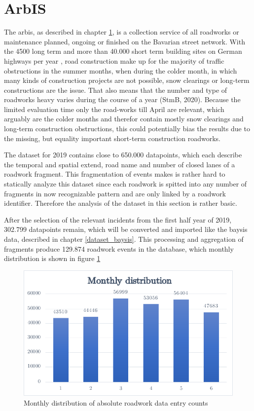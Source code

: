 \documentclass[a4paper,12pt]{report}
\begin{document}
\section{ArbIS}
\label{dataset_arbis}

The \acrfull{arbis}, as described in chapter \ref{dataset_arbis}, is a collection service of all roadworks or maintenance planned, ongoing or finished on the Bavarian street network. With the 4500 long term and more than 40.000 short term building sites on German highways per year \cite{LAPID2018,Stmi2020}, road construction make up for the majority of traffic obstructions in the summer months, when during the colder month, in which many kinds of construction projects are not possible, snow clearings or long-term constructions are the issue. That also means that the number and type of roadworks heavy varies during the course of a year (StmB, 2020). Because the limited evaluation time only the road-works till April are relevant, which arguably are the colder months and therefor contain mostly snow clearings and long-term construction obstructions, this could potentially bias the results due to the missing, but equality important short-term construction roadworks.
\par The dataset for 2019 contains close to 650.000 datapoints, which each describe the temporal and spatial extend, road name and number of closed lanes of a roadwork fragment. This fragmentation of events makes is rather hard to statically analyze this dataset since each roadwork is spitted into any number of fragments in now recognizable pattern and are only linked by a roadwork identifier. Therefore the analysis of the dataset in this section is rather basic.
\par After the selection of the relevant incidents from the first half year of 2019, 302.799 datapoints remain, which will be converted and imported like the \acrshort{baysis} data, described in chapter \ref{dataset_baysis}. This processing and aggregation of fragments produce 129.874 roadwork events in the database, which monthly distribution is shown in figure \ref{img:arbis_dataset_monthly_absolute}


\begin{figure}[h]
	\centering
	\includegraphics[scale=0.6]{./assets/arbis_dataset_monthly_absolute}
	\caption{Monthly distribution of absolute roadwork data entry counts}
	\label{img:arbis_dataset_monthly_absolute}
\end{figure}
\end{document}
